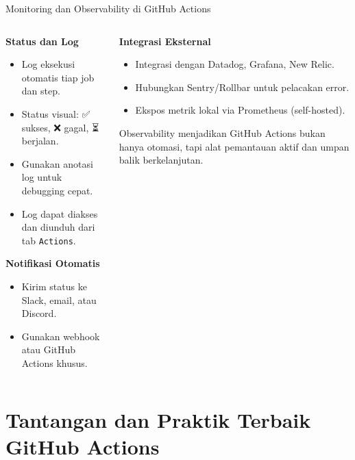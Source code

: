 \documentclass[aspectratio=169, table]{beamer}
\begin{document}
\begin{frame}[fragile]{Monitoring dan Observability di GitHub Actions}
	\vspace{20pt}
	
	\begin{columns}[T]
		\begin{column}{0.6\textwidth}
			\textbf{Status dan Log}
			\begin{itemize}
				\item Log eksekusi otomatis tiap job dan step.
				\item Status visual: ✅ sukses, ❌ gagal, ⏳ berjalan.
				\item Gunakan anotasi log untuk debugging cepat.
				\item Log dapat diakses dan diunduh dari tab \texttt{Actions}.
			\end{itemize}
			
			\vspace{4pt}
			\textbf{Notifikasi Otomatis}
			\begin{itemize}
				\item Kirim status ke Slack, email, atau Discord.
				\item Gunakan webhook atau GitHub Actions khusus.
			\end{itemize}
		\end{column}
		
		\begin{column}{0.4\textwidth}
			\textbf{Integrasi Eksternal}
			\begin{itemize}
				\item Integrasi dengan Datadog, Grafana, New Relic.
				\item Hubungkan Sentry/Rollbar untuk pelacakan error.
				\item Ekspos metrik lokal via Prometheus (self-hosted).
			\end{itemize}
			
			\vspace{6pt}
			Observability menjadikan GitHub Actions bukan hanya otomasi, tapi alat pemantauan aktif dan umpan balik berkelanjutan.
		\end{column}
	\end{columns}
\end{frame}


\section{Tantangan dan Praktik Terbaik GitHub Actions}
\end{document}
